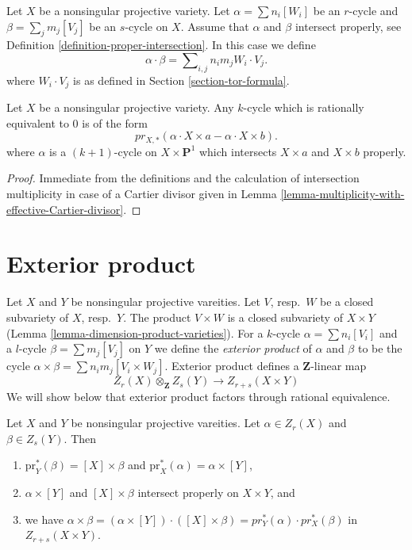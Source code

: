 \noindent
Let $X$ be a nonsingular projective variety. Let
$\alpha = \sum n_i [W_i]$ be an $r$-cycle and
$\beta = \sum_j m_j [V_j]$ be an $s$-cycle on $X$.
Assume that $\alpha$ and $\beta$ intersect properly, see
Definition \ref{definition-proper-intersection}.
In this case we define
$$
\alpha \cdot \beta = \sum\nolimits_{i,j} n_i m_j W_i \cdot V_j.
$$
where $W_i \cdot V_j$ is as defined in Section \ref{section-tor-formula}.

\begin{lemma}
\label{lemma-rational-equivalence-and-intersection}
Let $X$ be a nonsingular projective variety. Any $k$-cycle which is
rationally equivalent to $0$ is of the form
$$
pr_{X,*}( \alpha \cdot X \times a - \alpha \cdot X \times b).
$$
where $\alpha$ is a $(k + 1)$-cycle on $X \times \mathbf{P}^1$
which intersects $X \times a$ and $X \times b$ properly.
\end{lemma}

\begin{proof}
Immediate from the definitions and the calculation of intersection
multiplicity in case of a Cartier divisor given in
Lemma \ref{lemma-multiplicity-with-effective-Cartier-divisor}.
\end{proof}


\section{Exterior product}
\label{section-exterior-product}

\noindent
Let $X$ and $Y$ be nonsingular projective vareities.
Let $V$, resp.\ $W$ be a closed subvariety of $X$, resp.\ $Y$.
The product $V\times W$ is a closed subvariety of $X\times Y$
(Lemma \ref{lemma-dimension-product-varieties}).
For a $k$-cycle $\alpha = \sum n_i [V_i]$ and a $l$-cycle
$\beta = \sum m_j [V_j]$ on $Y$ we define the
{\it exterior product} of $\alpha$ and $\beta$ to be the cycle
$\alpha \times \beta = \sum n_i m_j [V_i \times W_j]$.
Exterior product defines a $\mathbf{Z}$-linear map
$$
Z_r(X) \otimes_\mathbf{Z} Z_s(Y) \longrightarrow Z_{r + s}(X \times Y)
$$
We will show below that exterior product factors through rational
equivalence.

\begin{lemma}
\label{lemma-exterior-product}
Let $X$ and $Y$ be nonsingular projective vareities.
Let $\alpha \in Z_r(X)$ and $\beta \in Z_s(Y)$.
Then
\begin{enumerate}
\item $\text{pr}_Y^*(\beta) = [X] \times \beta$ and
$\text{pr}_X^*(\alpha) = \alpha \times [Y]$,
\item $\alpha \times [Y]$ and $[X]\times \beta$
intersect properly on $X\times Y$, and
\item we have
$\alpha \times \beta =
(\alpha \times [Y])\cdot ([X]\times\beta) =
pr_Y^*(\alpha) \cdot pr_X^*(\beta)$
in $Z_{r + s}(X \times Y)$.
\end{enumerate}
\end{lemma}

